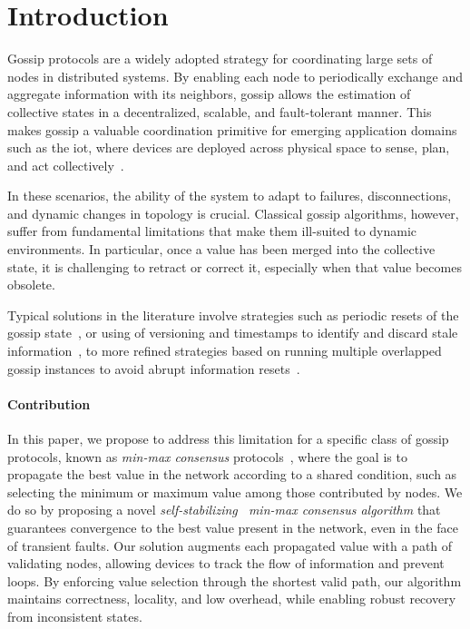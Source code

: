 \documentclass[runningheads]{llncs}
\begin{document}
\section{Introduction}
\label{sec:introduction}

Gossip protocols are a widely adopted strategy for coordinating large sets of nodes in distributed systems.
%
By enabling each node to periodically exchange and aggregate information with its neighbors,
gossip allows the estimation of collective states in a decentralized,
scalable, and fault-tolerant manner.
%
This makes gossip a valuable coordination primitive for emerging application domains such as the \ac{iot},
where devices are deployed across physical space to sense,
plan, and act collectively~\cite{DBLP:journals/computer/Zambonelli12,BealIEEEComputer2015,DBLP:journals/iot/ApolloniAM18}.

In these scenarios,
the ability of the system to adapt to failures,
disconnections, and dynamic changes in topology is crucial.
%
Classical gossip algorithms, however,
suffer from fundamental limitations that make them ill-suited to dynamic environments.
%
In particular,
once a value has been merged into the collective state,
it is challenging to retract or correct it, especially when that value becomes obsolete.

Typical solutions in the literature involve strategies such as periodic resets of the gossip state~\cite{DBLP:journals/tocs/JelasityMB05,DBLP:conf/europar/PruteanuID11},
or using of versioning and timestamps to identify and discard stale information~\cite{DBLP:conf/dsom/VoulgarisS03,DBLP:conf/iptps/GuptaBLDR03},
to more refined strategies based on running multiple overlapped gossip instances to avoid abrupt information resets~\cite{DBLP:conf/coordination/PianiniBV16}.

\paragraph{Contribution}
In this paper, we propose to address this limitation for a specific class of gossip protocols,
known as \emph{min-max consensus} protocols~\cite{DBLP:journals/ijon/LiYYZXZ24},
where the goal is to propagate the best value in the network according to a shared condition,
such as selecting the minimum or maximum value among those contributed by nodes.
%
We do so by proposing a novel \emph{self-stabilizing~\cite{DBLP:journals/cacm/Dijkstra74} min-max consensus algorithm}
that guarantees convergence to the best value present in the network,
even in the face of transient faults.
%
Our solution augments each propagated value with a path of validating nodes,
allowing devices to track the flow of information and prevent loops.
%
By enforcing value selection through the shortest valid path,
our algorithm maintains correctness, locality, and low overhead,
while enabling robust recovery from inconsistent states.
\end{document}
